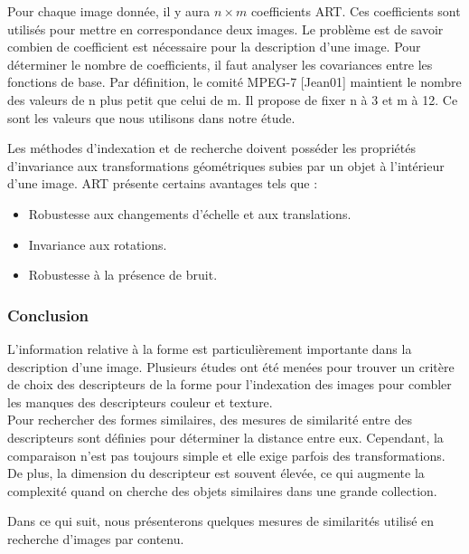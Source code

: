 Pour chaque image donnée, il y aura $ n \times m $  coefficients ART. Ces coefficients sont utilisés pour mettre en correspondance deux images. Le problème est de savoir combien de coefficient est nécessaire pour la description d’une image. Pour déterminer le nombre de coefficients, il faut analyser les covariances entre les fonctions de base. Par définition, le comité MPEG-7 [Jean01] maintient le nombre des valeurs de n plus petit que celui de m. Il propose de fixer n à 3 et m à 12. Ce sont les valeurs que nous utilisons dans notre étude.

Les méthodes d’indexation et de recherche doivent posséder les propriétés d’invariance aux
transformations géométriques subies par un objet à l’intérieur d’une image. ART présente certains avantages tels que :
\begin{itemize}
	\item  Robustesse aux changements d’échelle et aux translations.
	\item Invariance aux rotations.
	\item  Robustesse à la présence de bruit.
\end{itemize}

\subsubsection{Conclusion}
L'information relative à la forme est particulièrement importante dans la description d'une image. Plusieurs études ont été menées pour trouver un critère de choix des descripteurs de la forme pour l'indexation des images pour combler les manques des descripteurs couleur et texture.\\

Pour rechercher des formes similaires, des mesures de similarité entre des descripteurs sont définies pour déterminer la distance entre eux. Cependant, la comparaison n’est pas toujours simple et elle exige parfois des transformations. De plus, la dimension du descripteur est souvent élevée, ce qui augmente la complexité quand on cherche des objets similaires dans une grande collection.

Dans ce qui suit, nous présenterons quelques mesures de similarités utilisé en recherche d'images par contenu.

%
% 
%   
%
%






